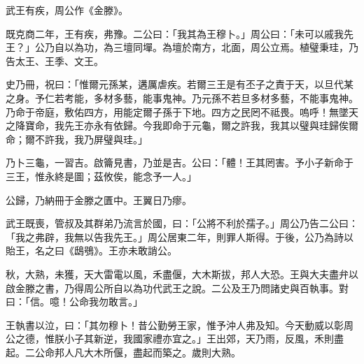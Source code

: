 
\begin{pinyinscope}
武王有疾，周公作《金滕》。

既克商二年，王有疾，弗豫。二公曰：「我其為王穆卜。」周公曰：「未可以戚我先王？」公乃自以為功，為三壇同墠。為壇於南方，北面，周公立焉。植璧秉珪，乃告太王、王季、文王。

史乃冊，祝曰：「惟爾元孫某，遘厲虐疾。若爾三王是有丕子之責于天，以旦代某之身。予仁若考能，多材多藝，能事鬼神。乃元孫不若旦多材多藝，不能事鬼神。乃命于帝庭，敷佑四方，用能定爾子孫于下地。四方之民罔不祗畏。嗚呼！無墜天之降寶命，我先王亦永有依歸。今我即命于元龜，爾之許我，我其以璧與珪歸俟爾命；爾不許我，我乃屏璧與珪。」

乃卜三龜，一習吉。啟籥見書，乃並是吉。公曰：「體！王其罔害。予小子新命于三王，惟永終是圖；茲攸俟，能念予一人。」

公歸，乃納冊于金滕之匱中。王翼日乃瘳。

武王既喪，管叔及其群弟乃流言於國，曰：「公將不利於孺子。」周公乃告二公曰：「我之弗辟，我無以告我先王。」周公居東二年，則罪人斯得。于後，公乃為詩以貽王，名之曰《鴟鴞》。王亦未敢誚公。

秋，大熟，未獲，天大雷電以風，禾盡偃，大木斯拔，邦人大恐。王與大夫盡弁以啟金滕之書，乃得周公所自以為功代武王之說。二公及王乃問諸史與百執事。對曰：「信。噫！公命我勿敢言。」

王執書以泣，曰：「其勿穆卜！昔公勤勞王家，惟予沖人弗及知。今天動威以彰周公之德，惟朕小子其新逆，我國家禮亦宜之。」王出郊，天乃雨，反風，禾則盡起。二公命邦人凡大木所偃，盡起而築之。歲則大熟。


\end{pinyinscope}
